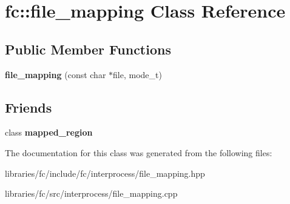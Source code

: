 \hypertarget{classfc_1_1file__mapping}{}\section{fc\+:\+:file\+\_\+mapping Class Reference}
\label{classfc_1_1file__mapping}
\subsection*{Public Member Functions}
\begin{DoxyCompactItemize}
\item 
\mbox{\label{classfc_1_1file__mapping_aed582b4a4f6434ab7f5685b898939121}} 
{\bfseries file\+\_\+mapping} (const char $\ast$file, mode\+\_\+t)
\end{DoxyCompactItemize}
\subsection*{Friends}
\begin{DoxyCompactItemize}
\item 
\mbox{\label{classfc_1_1file__mapping_a81825327c2aa0356634ea482a1403672}} 
class {\bfseries mapped\+\_\+region}
\end{DoxyCompactItemize}


The documentation for this class was generated from the following files\+:\begin{DoxyCompactItemize}
\item 
libraries/fc/include/fc/interprocess/file\+\_\+mapping.\+hpp\item 
libraries/fc/src/interprocess/file\+\_\+mapping.\+cpp\end{DoxyCompactItemize}
